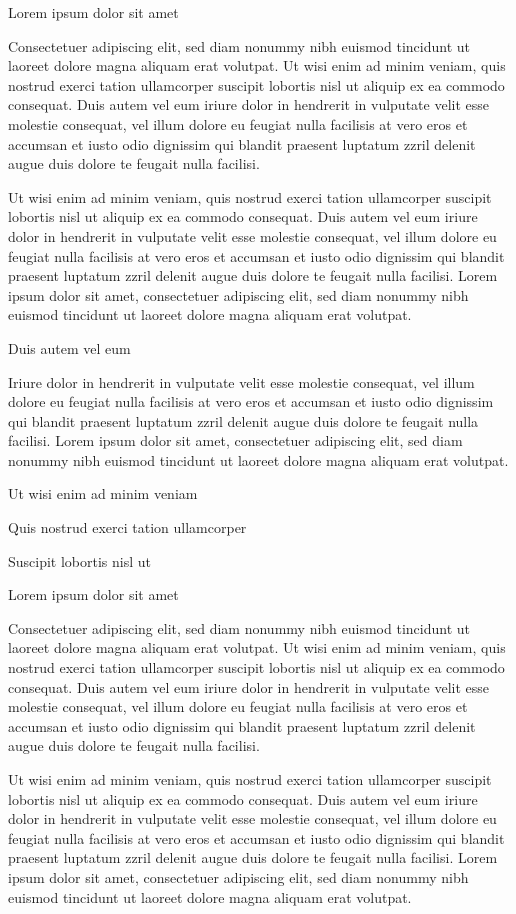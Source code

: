 \documentclass[11pt,twoside]{article}\makeatletter
\begin{document}
Lorem ipsum dolor sit amet\par
Consectetuer adipiscing elit, sed diam nonummy nibh euismod tincidunt ut laoreet dolore magna aliquam erat volutpat. Ut wisi enim ad minim veniam, quis nostrud exerci tation ullamcorper suscipit lobortis nisl ut aliquip ex ea commodo consequat. Duis autem vel eum iriure dolor in hendrerit in vulputate velit esse molestie consequat, vel illum dolore eu feugiat nulla facilisis at vero eros et accumsan et iusto odio dignissim qui blandit praesent luptatum zzril delenit augue duis dolore te feugait nulla facilisi.\par
Ut wisi enim ad minim veniam, quis nostrud exerci tation ullamcorper suscipit lobortis nisl ut aliquip ex ea commodo consequat. Duis autem vel eum iriure dolor in hendrerit in vulputate velit esse molestie consequat, vel illum dolore eu feugiat nulla facilisis at vero eros et accumsan et iusto odio dignissim qui blandit praesent luptatum zzril delenit augue duis dolore te feugait nulla facilisi. Lorem ipsum dolor sit amet, consectetuer adipiscing elit, sed diam nonummy nibh euismod tincidunt ut laoreet dolore magna aliquam erat volutpat. \par
Duis autem vel eum \par
Iriure dolor in hendrerit in vulputate velit esse molestie consequat, vel illum dolore eu feugiat nulla facilisis at vero eros et accumsan et iusto odio dignissim qui blandit praesent luptatum zzril delenit augue duis dolore te feugait nulla facilisi. Lorem ipsum dolor sit amet, consectetuer adipiscing elit, sed diam nonummy nibh euismod tincidunt ut laoreet dolore magna aliquam erat volutpat. \par
Ut wisi enim ad minim veniam\par
Quis nostrud exerci tation ullamcorper \par
Suscipit lobortis nisl ut \par
Lorem ipsum dolor sit amet\par
Consectetuer adipiscing elit, sed diam nonummy nibh euismod tincidunt ut laoreet dolore magna aliquam erat volutpat. Ut wisi enim ad minim veniam, quis nostrud exerci tation ullamcorper suscipit lobortis nisl ut aliquip ex ea commodo consequat. Duis autem vel eum iriure dolor in hendrerit in vulputate velit esse molestie consequat, vel illum dolore eu feugiat nulla facilisis at vero eros et accumsan et iusto odio dignissim qui blandit praesent luptatum zzril delenit augue duis dolore te feugait nulla facilisi.\par
Ut wisi enim ad minim veniam, quis nostrud exerci tation ullamcorper suscipit lobortis nisl ut aliquip ex ea commodo consequat. Duis autem vel eum iriure dolor in hendrerit in vulputate velit esse molestie consequat, vel illum dolore eu feugiat nulla facilisis at vero eros et accumsan et iusto odio dignissim qui blandit praesent luptatum zzril delenit augue duis dolore te feugait nulla facilisi. Lorem ipsum dolor sit amet, consectetuer adipiscing elit, sed diam nonummy nibh euismod tincidunt ut laoreet dolore magna aliquam erat volutpat. \par
\end{document}
